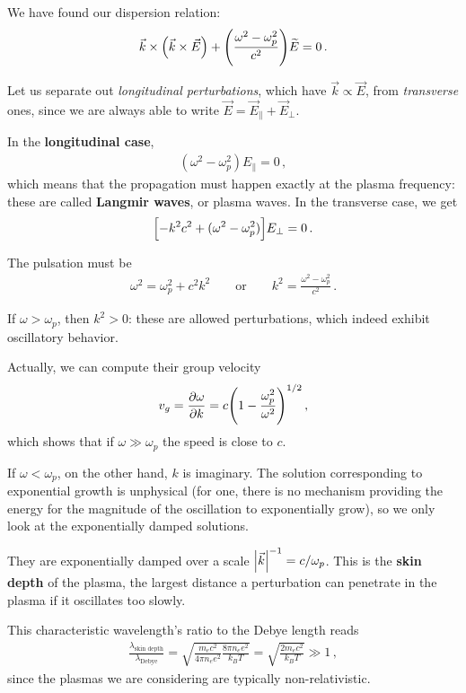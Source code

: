 \documentclass[main.tex]{subfiles}
\begin{document}
We have found our dispersion relation: 
%
\begin{align}
\vec{k} \times \qty(\vec{k} \times \vec{E})
+ \qty(\frac{\omega^2 - \omega _p^2}{c^2}) \widetilde{E} = 0
\,.
\end{align}

Let us separate out \emph{longitudinal perturbations}, which have \(\vec{k} \propto \vec{E}\), from \emph{transverse} ones, since we are always able to write \(\vec{E} = \vec{E}_\parallel + \vec{E}_\perp\). 

In the \textbf{longitudinal case},
%
\begin{align}
(\omega^2 - \omega _p^2) E_{\parallel} = 0
\,,
\end{align}
%
which means that the propagation must happen exactly at the plasma frequency: these are called \textbf{Langmir waves}, or plasma waves. 
In the transverse case, we get 
%
\begin{align}
\qty[ - k^2 c^2 + (\omega^2 - \omega _p^2)] E_\perp = 0
\,.
\end{align}

The pulsation must be 
%
\begin{align}
\omega^2 = \omega _p^2 + c^2 k^2
\qquad \text{or} \qquad
k^2 = \frac{\omega^2 - \omega^2_p}{c^2}
\,.
\end{align}

If \(\omega > \omega _p\), then \(k^2 > 0 \): these are allowed perturbations, which indeed exhibit oscillatory behavior.

Actually, we can compute their group velocity 
%
\begin{align}
v_g = \pdv{\omega }{k} = c \qty(1 - \frac{\omega_p^2}{\omega^2})^{1/2}
\,,
\end{align}
%
which shows that if \(\omega \gg \omega _p\) the speed is close to \(c\). 

If \(\omega < \omega _p\), on the other hand, \(k\) is imaginary.
The solution corresponding to exponential growth is unphysical (for one, there is no mechanism providing the energy for the magnitude of the oscillation to exponentially grow), so we only look at the exponentially damped solutions. 

They are exponentially damped over a scale \(\abs{\vec{k}}^{-1} = c / \omega _p\).
This is the \textbf{skin depth} of the plasma, the largest distance a perturbation can penetrate in the plasma if it oscillates too slowly.

This characteristic wavelength's ratio to the Debye length reads 
%
\begin{align}
\frac{\lambda _{\text{skin depth}}}{ \lambda _{\text{Debye}}} 
= \sqrt{\frac{m_e c^2}{4 \pi n_e e^2} \frac{8 \pi n_e e^2}{k_B T}}
= \sqrt{\frac{2 m_e c^2}{k_B T}} \gg 1
\,,
\end{align}
%
since the plasmas we are considering are typically non-relativistic. 
\end{document}
